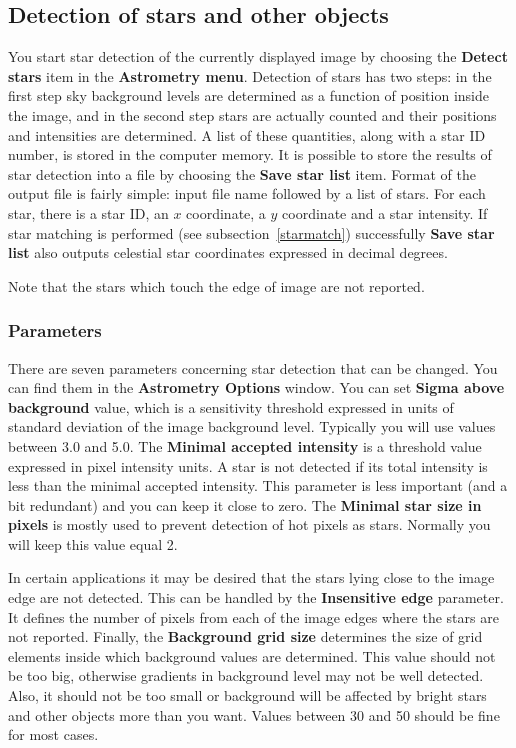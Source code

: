 \documentclass[11pt]{article}
\begin{document}
\subsection{Detection of stars and other objects}

You start star detection of the currently displayed image by choosing
the \textbf{Detect stars} item in the \textbf{Astrometry menu}.
Detection of stars has two steps: in the first step sky background
levels are determined as a function of position inside the image, and
in the second step stars are actually counted and their positions and
intensities are determined.  A list of these quantities, along with a
star ID number, is stored in the computer memory.  It is possible to
store the results of star detection into a file by choosing the
\textbf{Save star list} item.  Format of the output file is fairly
simple: input file name followed by a list of stars.  For each star,
there is a star ID, an $x$ coordinate, a $y$ coordinate and a star
intensity.  If star matching is performed (see
subsection~\ref{starmatch}) successfully \textbf{Save star list} also
outputs celestial star coordinates expressed in decimal degrees.

Note that the stars which touch the edge of image are not reported.

\subsubsection{Parameters}

There are seven parameters concerning star detection that can be
changed.  You can find them in the \textbf{Astrometry Options} window.
You can set \textbf{Sigma above background} value, which is a
sensitivity threshold expressed in units of standard deviation of the
image background level.  Typically you will use values between 3.0 and
5.0.  The \textbf{Minimal accepted intensity} is a threshold value
expressed in pixel intensity units.  A star is not detected if its
total intensity is less than the minimal accepted intensity.  This
parameter is less important (and a bit redundant) and you can keep it
close to zero.  The \textbf{Minimal star size in pixels} is mostly
used to prevent detection of hot pixels as stars.  Normally you will
keep this value equal 2.

In certain applications it may be desired that the stars lying close
to the image edge are not detected.  This can be handled by the
\textbf{Insensitive edge} parameter.  It defines the number of pixels
from each of the image edges where the stars are not reported.
Finally, the \textbf{Background grid size} determines the size of grid
elements inside which background values are determined.  This value
should not be too big, otherwise gradients in background level may not
be well detected.  Also, it should not be too small or background will
be affected by bright stars and other objects more than you want.
Values between 30 and 50 should be fine for most cases.
\end{document}
